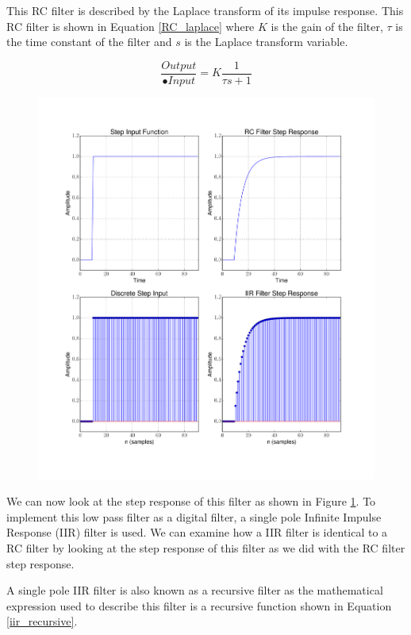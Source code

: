 This RC filter is described by the Laplace transform of its impulse response.  This RC filter is shown in Equation \ref{RC_laplace} where $K$ is the gain of the filter, $\tau$ is the time constant of the filter and $s$ is the Laplace transform variable.

\begin{equation}\label{RC_laplace}
\frac{Output}{•Input} = K \frac{1}{\tau s + 1}
\end{equation}

{\begin{figure}[h!tb] 
\centering
\includegraphics[width=17cm]{Experiments/Exp6/all_four.pdf}
\label{rc_response}
\end{figure}
}

We can now look at the step response of this filter as shown in Figure \ref{rc_response}.  To implement this low pass filter as a digital filter, a single pole Infinite Impulse Response (IIR) filter is used.  We can examine how a IIR filter is identical to a RC filter by looking at the step response of this filter as we did with the RC filter step response.

A single pole IIR filter is also known as a recursive filter as the mathematical expression used to describe this filter is a recursive function shown in Equation \ref{iir_recursive}.  

